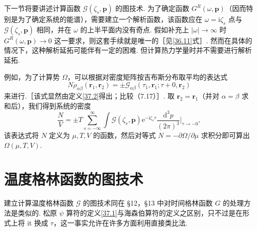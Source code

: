 下一节将要讲述计算函数 $\mathcal G(\zeta_s,\bm p)$ 的图技术. 为了确定函数 $G^{R}(\omega,\bm p)$（因而特别是为了确定系统的能谱），需要建立一个解析函数，该函数应在 $\omega=\mathrm{i}\zeta_s$ 点与 $\mathcal G(\zeta_s,\bm p)$ 相同，并在 $\omega$ 的上半平面内没有奇点. 假如补充上 $|\omega|\to\infty$ 时 $G^{R}(\omega,\bm p)\to 0$ 这一要求，则这套手续就是唯一的［见\eqref{36.11}式］. 然而在具体的情况下，这种解析延拓可能伴有一定的困难. 但计算热力学量时并不需要进行解析延拓.

例如，为了计算势 $\Omega$，可以根据对密度矩阵按吉布斯分布取平均的表达式
\begin{equation}
N\rho_{\alpha\beta}(\bm r_1,\bm r_2)=\pm\mathcal G_{\alpha\beta}(\tau_1,\bm r_1;\tau+0,\bm r_2)
\label{37.14}
\end{equation}
来进行.［该式显然由定义\eqref{37.2}得出；比较（7.17）］. 取 $\bm r_2=\bm r_1$（并对 $\alpha=\beta$ 求和后），我们得到系统的密度
\begin{equation}
\frac{N}{V}=\pm T\sum_{s=-\infty}^{\infty}\int\mathcal G(\zeta_s,\bm p)\mathrm{e}^{-\mathrm{i}\zeta_s\tau}
\frac{\mathrm{d}^{3}p}{(2\pi)^{3}}\bigg|_{\tau\to-0},
\label{37.15}
\end{equation}
该表达式将 $N$ 定义为 $\mu,T,V$ 的函数，然后对等式 $N=-\partial\Omega/\partial\mu$ 求积分即可算出 $\Omega(\mu,T,V)$.

\section{温度格林函数的图技术}

建立计算温度格林函数 $\mathcal G$ 的图技术同在 §12，§13 中对时间格林函数 $G$ 的处理方法是类似的. 松原 $\psi$ 算符的定义\eqref{37.1}与海森伯算符的定义之区别，只不过是在形式上将 it 换成 $\tau$，这一事实允许在许多方面利用直接类比法.

